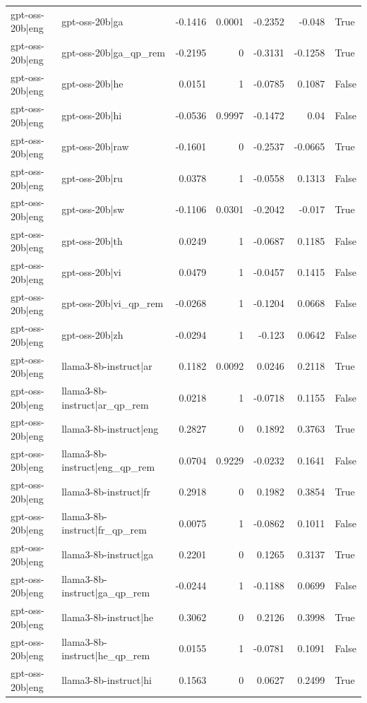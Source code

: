 \begin{table}
\begin{tabular}{l l r r r r l}
gpt-oss-20b|eng & gpt-oss-20b|ga & -0.1416 & 0.0001 & -0.2352 & -0.048 & True \\
gpt-oss-20b|eng & gpt-oss-20b|ga_qp_rem & -0.2195 & 0 & -0.3131 & -0.1258 & True \\
gpt-oss-20b|eng & gpt-oss-20b|he & 0.0151 & 1 & -0.0785 & 0.1087 & False \\
gpt-oss-20b|eng & gpt-oss-20b|hi & -0.0536 & 0.9997 & -0.1472 & 0.04 & False \\
gpt-oss-20b|eng & gpt-oss-20b|raw & -0.1601 & 0 & -0.2537 & -0.0665 & True \\
gpt-oss-20b|eng & gpt-oss-20b|ru & 0.0378 & 1 & -0.0558 & 0.1313 & False \\
gpt-oss-20b|eng & gpt-oss-20b|sw & -0.1106 & 0.0301 & -0.2042 & -0.017 & True \\
gpt-oss-20b|eng & gpt-oss-20b|th & 0.0249 & 1 & -0.0687 & 0.1185 & False \\
gpt-oss-20b|eng & gpt-oss-20b|vi & 0.0479 & 1 & -0.0457 & 0.1415 & False \\
gpt-oss-20b|eng & gpt-oss-20b|vi_qp_rem & -0.0268 & 1 & -0.1204 & 0.0668 & False \\
gpt-oss-20b|eng & gpt-oss-20b|zh & -0.0294 & 1 & -0.123 & 0.0642 & False \\
gpt-oss-20b|eng & llama3-8b-instruct|ar & 0.1182 & 0.0092 & 0.0246 & 0.2118 & True \\
gpt-oss-20b|eng & llama3-8b-instruct|ar_qp_rem & 0.0218 & 1 & -0.0718 & 0.1155 & False \\
gpt-oss-20b|eng & llama3-8b-instruct|eng & 0.2827 & 0 & 0.1892 & 0.3763 & True \\
gpt-oss-20b|eng & llama3-8b-instruct|eng_qp_rem & 0.0704 & 0.9229 & -0.0232 & 0.1641 & False \\
gpt-oss-20b|eng & llama3-8b-instruct|fr & 0.2918 & 0 & 0.1982 & 0.3854 & True \\
gpt-oss-20b|eng & llama3-8b-instruct|fr_qp_rem & 0.0075 & 1 & -0.0862 & 0.1011 & False \\
gpt-oss-20b|eng & llama3-8b-instruct|ga & 0.2201 & 0 & 0.1265 & 0.3137 & True \\
gpt-oss-20b|eng & llama3-8b-instruct|ga_qp_rem & -0.0244 & 1 & -0.1188 & 0.0699 & False \\
gpt-oss-20b|eng & llama3-8b-instruct|he & 0.3062 & 0 & 0.2126 & 0.3998 & True \\
gpt-oss-20b|eng & llama3-8b-instruct|he_qp_rem & 0.0155 & 1 & -0.0781 & 0.1091 & False \\
gpt-oss-20b|eng & llama3-8b-instruct|hi & 0.1563 & 0 & 0.0627 & 0.2499 & True \\

\end{tabular}
\end{table}
